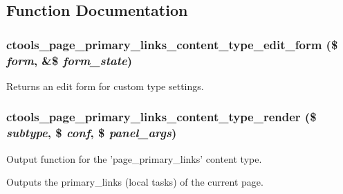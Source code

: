 \subsection{Function Documentation}
\hypertarget{page__primary__links_8inc_adecf961a47fccf41c561c03fff4ce82e}{
\subsubsection[{ctools\_\-page\_\-primary\_\-links\_\-content\_\-type\_\-edit\_\-form}]{\setlength{\rightskip}{0pt plus 5cm}ctools\_\-page\_\-primary\_\-links\_\-content\_\-type\_\-edit\_\-form (\$ {\em form}, \/  \&\$ {\em form\_\-state})}}
\label{page__primary__links_8inc_adecf961a47fccf41c561c03fff4ce82e}
Returns an edit form for custom type settings. \hypertarget{page__primary__links_8inc_ab8d2e02aae2cba7c3be18b93668a353c}{
\subsubsection[{ctools\_\-page\_\-primary\_\-links\_\-content\_\-type\_\-render}]{\setlength{\rightskip}{0pt plus 5cm}ctools\_\-page\_\-primary\_\-links\_\-content\_\-type\_\-render (\$ {\em subtype}, \/  \$ {\em conf}, \/  \$ {\em panel\_\-args})}}
\label{page__primary__links_8inc_ab8d2e02aae2cba7c3be18b93668a353c}
Output function for the 'page\_\-primary\_\-links' content type.

Outputs the primary\_\-links (local tasks) of the current page. 

